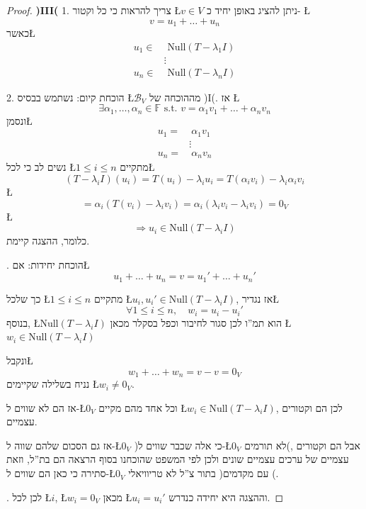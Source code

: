 \documentclass[english,hebrew]{article}
\begin{document}
\begin{proof}
\textbf{)III(} 1. צריך להראות כי כל וקטור \L{$v\in V$} ניתן להציג
באופן יחיד כ- \L{%
\[
v=u_{1}+\dots+u_{n}
\]
}%
כאשר\L{%
\begin{align*}
u_{1}\in & \text{\ Null}(T-\lambda_{1}I)\\
 & \vdots\\
u_{n}\in & \text{\ Null}(T-\lambda_{n}I)
\end{align*}
}%

2. הוכחת קיום: נשתמש בבסיס \L{$\mathcal{B}_{V}$} מההוכחה של )I(.
אז \L{%
\[
\exists\alpha_{1},\dots,\alpha_{n}\in\mathbb{F}\text{ s.t. }v=\alpha_{1}v_{1}+\dots+\alpha_{n}v_{n}
\]
}%
ונסמן\L{%
\begin{align*}
u_{1}= & \ \alpha_{1}v_{1}\\
 & \vdots\\
u_{n}= & \ \alpha_{n}v_{n}
\end{align*}
}%
נשים לב כי לכל \L{$1\le i\le n$} מתקיים\L{%
\[
(T-\lambda_{i}I)\left(u_{i}\right)=T(u_{i})-\lambda_{i}u_{i}=T(\alpha_{i}v_{i})-\lambda_{i}\alpha_{i}v_{i}
\]
}%
\L{%
\[
=\alpha_{i}\left(T(v_{i})-\lambda_{i}v_{i}\right)=\alpha_{i}\left(\lambda_{i}v_{i}-\lambda_{i}v_{i}\right)=0_{V}
\]
}%
\L{%
\[
\Rightarrow u_{i}\in\text{Null}(T-\lambda_{i}I)
\]
}%
כלומר, ההצגה קיימת. 

{\endL}. הוכחת יחידות: אם\L{%
\[
u_{1}+\dots+u_{n}=v=u_{1}'+\dots+u_{n}'
\]
}%

כך שלכל \L{$1\le i\le n$} מתקיים \L{$u_{i},u_{i}'\in\text{Null}(T-\lambda_{i}I)$},
אז נגדיר\L{%
\[
\forall1\le i\le n,\quad w_{i}=u_{i}-u_{i}'
\]
}%
בנוסף, \L{$\text{Null}(T-\lambda_{i}I)$} הוא תמ\textquotedblright ו
לכן סגור לחיבור וכפל בסקלר מכאן \L{$w_{i}\in\text{Null}(T-\lambda_{i}I)$}

ונקבל\L{%
\[
w_{1}+\dots+w_{n}=v-v=0_{V}
\]
}%
נניח בשלילה שקיימים \L{$w_{i}\ne0_{V}$}.

אז הם לא שווים ל-\L{$0_{V}$} וכל אחד מהם מקיים \L{$w_{i}\in\text{Null}(T-\lambda_{i}I)$},
לכן הם וקטורים עצמיים.

אז גם הסכום שלהם שווה ל-\L{$0_{V}$} )כי אלה שכבר שווים ל-\L{$0_{V}$}
לא תורמים(, אבל הם וקטורים עצמיים של ערכים עצמיים שונים ולכן לפי המשפט
שהוכחנו בסוף הרצאה {\endL} הם בת\textquotedblright ל, וזאת
סתירה כי כאן הם שווים ל-\L{$0_{V}$} בתור צ\textquotedblright ל לא
טריוויאלי )עם מקדמים {\endL}(.

{\endL}. לכן לכל \L{$i$}, \L{$w_{i}=0_{V}$} מכאן \L{$u_{i}=u_{i}'$}
וההצגה היא יחידה כנדרש.
\end{proof}
\end{document}
